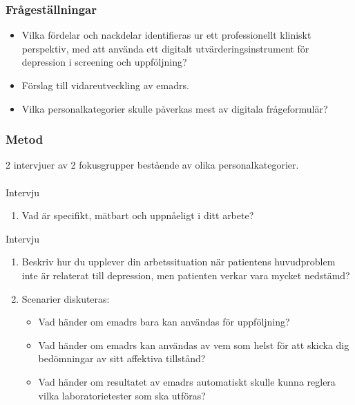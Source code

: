 \documentclass[english]{beamer}
\begin{document}
\begin{frame}
\frametitle{Fr{\aa}gest{\"a}llningar}
	\begin{itemize}
	\item Vilka f{\"o}rdelar och nackdelar identifieras ur ett professionellt kliniskt perspektiv, med att anv{\"a}nda ett digitalt utv{\"a}rderingsinstrument f{\"o}r depression i screening och uppf{\"o}ljning?
	\item F{\"o}rslag till vidareutveckling av e{\sc madrs}.
	\item Vilka personalkategorier skulle p{\aa}verkas mest av digitala fr{\aa}geformul{\"a}r?
	\end{itemize}
\end{frame}

\begin{frame}
\frametitle{Metod}
2 intervjuer av 2 fokusgrupper best{\aa}ende av olika personalkategorier.\\\ \\

Intervju {}%
\begin{enumerate}
\item {\bf} Vad {\"a}r specifikt, m{\"a}tbart och uppn{\aa}eligt i ditt arbete?
\end{enumerate}
Intervju {}%
\begin{enumerate}
\item {\bf} Beskriv hur du upplever din arbetssituation n{\"a}r patientens huvudproblem inte {\"a}r relaterat till depression, men patienten verkar vara mycket nedst{\"a}md?\vspace{-.33em}
\item {\bf} Scenarier diskuteras:%
\begin{itemize}%
\item {\bf} Vad h{\"a}nder om e{\sc madrs} bara kan anv{\"a}ndas f{\"or} uppf{\"o}ljning?%
\item {\bf} Vad h{\"a}nder om e{\sc madrs} kan anv{\"a}ndas av vem som helst f{\"o}r att skicka dig bed{\"o}mningar av sitt affektiva tillst{\aa}nd?%
\item {\bf} Vad h{\"a}nder om resultatet av e{\sc madrs} automatiskt skulle kunna reglera vilka laboratorietester som ska utf{\"o}ras?
\end{itemize}
\end{enumerate}
\end{frame}
\end{document}
